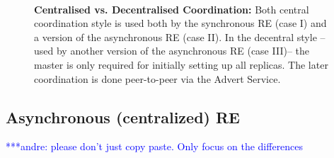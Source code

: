 \documentclass{rspublic}
\newcommand{\alnote}[1]{ {\textcolor{blue} { ***andre: #1 }}}
\newcommand{\alnote}[1]{}
\begin{document}

\begin{figure}%
\centering
{}\qquad
{}\\
\caption{\textbf{Centralised vs. Decentralised Coordination:} Both
  central coordination style is used both by the synchronous RE (case
  I) and a version of the asynchronous RE (case II).  In the decentral
  style -- used by another version of the asynchronous RE (case III)--
  the master is only required for initially setting up all
  replicas. The later coordination is done peer-to-peer via the Advert
  Service.}
\label{fig:coordination}
\end{figure}


\subsection{Asynchronous (centralized) RE}
\alnote{please don't just copy paste. Only focus on the differences}
\end{document}
